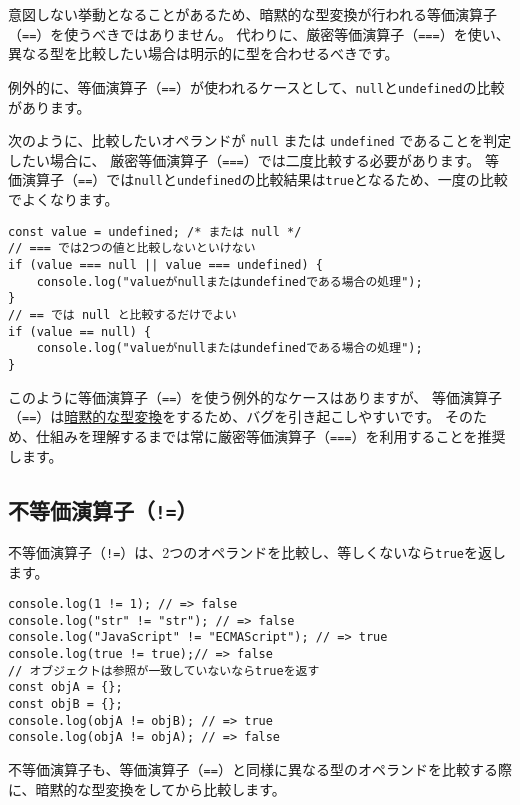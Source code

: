 意図しない挙動となることがあるため、暗黙的な型変換が行われる等価演算子（\texttt{==}）を使うべきではありません。
代わりに、厳密等価演算子（\texttt{===}）を使い、異なる型を比較したい場合は明示的に型を合わせるべきです。

例外的に、等価演算子（\texttt{==}）が使われるケースとして、\texttt{null}と\texttt{undefined}の比較があります。

次のように、比較したいオペランドが \texttt{null} または
\texttt{undefined} であることを判定したい場合に、
厳密等価演算子（\texttt{===}）では二度比較する必要があります。
等価演算子（\texttt{==}）では\texttt{null}と\texttt{undefined}の比較結果は\texttt{true}となるため、一度の比較でよくなります。

\begin{lstlisting}
const value = undefined; /* または null */
// === では2つの値と比較しないといけない
if (value === null || value === undefined) {
    console.log("valueがnullまたはundefinedである場合の処理");
}
// == では null と比較するだけでよい
if (value == null) {
    console.log("valueがnullまたはundefinedである場合の処理");
}
\end{lstlisting}

このように等価演算子（\texttt{==}）を使う例外的なケースはありますが、
等価演算子（\texttt{==}）は\href{../implicit-coercion/README}{暗黙的な型変換}をするため、バグを引き起こしやすいです。
そのため、仕組みを理解するまでは常に厳密等価演算子（\texttt{===}）を利用することを推奨します。

\hypertarget{not-equal-operator}{%
\subsection{\texorpdfstring{不等価演算子（\texttt{!=}）}{不等価演算子（!=）}}\label{not-equal-operator}}

不等価演算子（\texttt{!=}）は、2つのオペランドを比較し、等しくないなら\texttt{true}を返します。

\begin{lstlisting}
console.log(1 != 1); // => false
console.log("str" != "str"); // => false
console.log("JavaScript" != "ECMAScript"); // => true
console.log(true != true);// => false
// オブジェクトは参照が一致していないならtrueを返す
const objA = {};
const objB = {};
console.log(objA != objB); // => true
console.log(objA != objA); // => false
\end{lstlisting}

不等価演算子も、等価演算子（\texttt{==}）と同様に異なる型のオペランドを比較する際に、暗黙的な型変換をしてから比較します。

